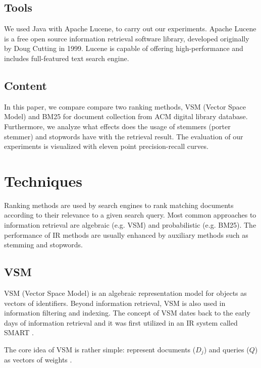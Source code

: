 \FloatBarrier



\subsection{Tools}

We used Java with Apache Lucene, to carry out our experiments. Apache Lucene is a free open source information retrieval software library, developed originally by Doug Cutting in 1999.  Lucene is capable of offering high-performance and includes full-featured text search engine.

\subsection{Content}

In this paper, we compare compare two ranking methods, VSM (Vector Space Model) and BM25 for document collection from ACM digital library database. Furthermore, we analyze what effects does the usage of stemmers (porter stemmer) and stopwords have with the retrieval result. The evaluation of our experiments is visualized with eleven point precision-recall curves. 

\section{Techniques}

Ranking methods are used by search engines to rank matching documents according to their relevance to a given search query. Most common approaches to information retrieval are algebraic (e.g. VSM) and probabilistic (e.g. BM25). The performance of IR methods are usually enhanced by auxiliary methods such as stemming and stopwords.

\subsection{VSM}

VSM (Vector Space Model) is an algebraic representation model for objects as vectors of identifiers. Beyond information retrieval, VSM is also used in information filtering and indexing. The concept of VSM dates back to the early days of information retrieval and it was first utilized in an IR system called SMART \citep{dubin2004most}.

The core idea of VSM is rather simple: represent documents ($D_j$) and queries ($Q$) as vectors of weights \citep{Salton:1975:VSM:361219.361220}.

